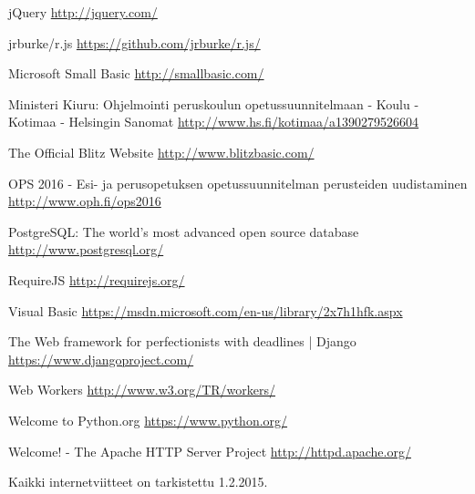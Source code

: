 \begin{thebibliography}{99}
	jQuery \url{http://jquery.com/}
	
	jrburke/r.js \url{https://github.com/jrburke/r.js/}
	
	Microsoft Small Basic \url{http://smallbasic.com/}
	
	Ministeri Kiuru: Ohjelmointi peruskoulun opetussuunnitelmaan - Koulu - Kotimaa - Helsingin Sanomat \url{http://www.hs.fi/kotimaa/a1390279526604}
	
	The Official Blitz Website \url{http://www.blitzbasic.com/}
	
	OPS 2016 - Esi- ja perusopetuksen opetussuunnitelman perusteiden uudistaminen \url{http://www.oph.fi/ops2016}
	
	PostgreSQL: The world's most advanced open source database \url{http://www.postgresql.org/}

	RequireJS \url{http://requirejs.org/}

	Visual Basic \url{https://msdn.microsoft.com/en-us/library/2x7h1hfk.aspx}

	The Web framework for perfectionists with deadlines | Django \url{https://www.djangoproject.com/}
	
	Web Workers \url{http://www.w3.org/TR/workers/}

	Welcome to Python.org \url{https://www.python.org/}
	
	Welcome! - The Apache HTTP Server Project \url{http://httpd.apache.org/}

\end{thebibliography}

Kaikki internetviitteet on tarkistettu 1.2.2015.
